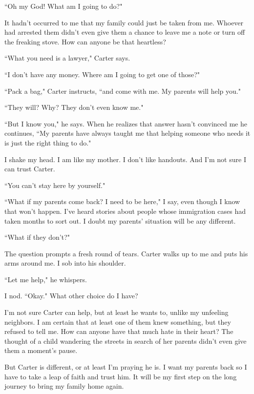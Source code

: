 \documentclass[10pt,a4paper]{article}
\newcommand{\qm}[1]{``#1"}
\begin{document}
\qm{Oh my God! What am I going to do?}

It hadn't occurred to me that my family could just be taken from me. Whoever had arrested them didn't even give them a chance to leave me a note or turn off the freaking stove. How can anyone be that heartless?

\qm{What you need is a lawyer,} Carter says.

\qm{I don't have any money. Where am I going to get one of those?}

\qm{Pack a bag,} Carter instructs, \qm{and come with me. My parents will help you.}

\qm{They will? Why? They don't even know me.}

\qm{But I know you,} he says. When he realizes that answer hasn't convinced me he continues, \qm{My parents have always taught me that helping someone who needs it is just the right thing to do.}

I shake my head. I am like my mother. I don't like handouts. And I'm not sure I can trust Carter.

\qm{You can't stay here by yourself.}

\qm{What if my parents come back? I need to be here,} I say, even though I know that won't happen. I've heard stories about people whose immigration cases had taken months to sort out. I doubt my parents' situation will be any different.

\qm{What if they don't?}

The question prompts a fresh round of tears. Carter walks up to me and puts his arms around me. I sob into his shoulder.

\qm{Let me help,} he whispers.

I nod. \qm{Okay.} What other choice do I have?

I'm not sure Carter can help, but at least he wants to, unlike my unfeeling neighbors. I am certain that at least one of them knew something, but they refused to tell me. How can anyone have that much hate in their heart? The thought of a child wandering the streets in search of her parents didn't even give them a moment's pause.

But Carter is different, or at least I'm praying he is. I want my parents back so I have to take a leap of faith and trust him. It will be my first step on the long journey to bring my family home again.
\end{document}
